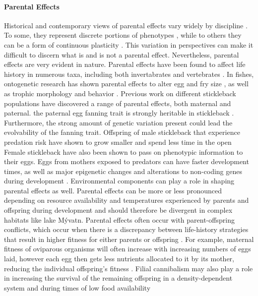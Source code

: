 \documentclass[12pt]{extarticle}
\begin{document}
\paragraph{Parental Effects}
Historical and contemporary views of parental effects vary widely by discipline \citep{Badyaev2009}. To some, they represent discrete portions of phenotypes \citep{Wolf2009}, while to others they can be a form of continuous plasticity \citep{Mousseau1998}. This variation in perspectives can make it difficult to discern what is and is not a parental effect. Nevertheless, parental effects are very evident in nature.
Parental effects have been found to affect life history in numerous taxa, including both invertabrates \citep{Beckers2015, Kingsolver2007} and vertebrates \citep{Badyaev2002, Zhang2009}. In fishes, ontogenetic research has shown parental effects to alter egg and fry size \citep{Tibblin2015, Gregersen2006, Gregersen2008, Feiner2016}, as well as trophic morphology \citep{Holtmeier2001, SKULASON1989} and behavior \citep{White2019, Mcghee2012, Stratmann2014}.  
Previous work on different stickleback populations have discovered a range of parental effects, both maternal and paternal. the paternal egg fanning trait is strongly heritable in stickleback \citep{Bell2018}. Furthermore, the strong amount of genetic variation present could lead the evolvability of the fanning trait. Offspring of male stickleback that experience predation risk have shown to grow smaller and spend less time in the open \citep{Bell2016, Stein2014} Female stickleback have also been shown to pass on phenotypic information to their eggs. Eggs from mothers exposed to predators can have faster development times, as well as major epigenetic changes and alterations to non-coding genes during development \citep{Mommer2014, Bell2016}. Environmental components can play a role in shaping parental effects as well. Parental effects can be more or less pronounced depending on resource availability and temperatures experienced by parents and offspring during development \citep{Rasanen2007} and should therefore be divergent in complex habitats like lake M\'yvatn. Parental effects often occur with parent-offspring conflicts, which occur when there is a discrepancy between life-history strategies that result in higher fitness for either parents or offspring \citep{Uller2008}. For example, maternal fitness of oviparous organisms will often increase with increasing numbers of eggs laid, however each egg then gets less nutrients allocated to it by its mother, reducing the individual offspring's fitness \citep{Uller2008, Rasanen2007}. Filial cannibalism may also play a role in increasing the survival of the remaining offspring in a density-dependent system and during times of low food availability \citep{Bartrons2018} \\
\end{document}
